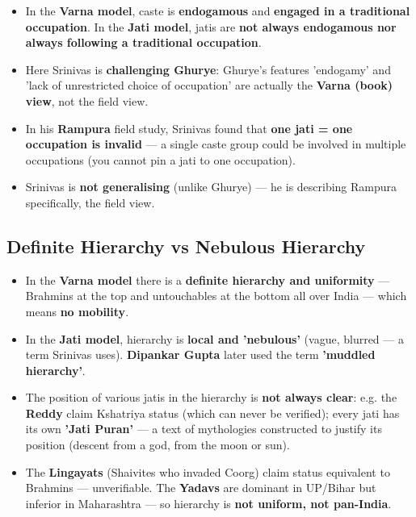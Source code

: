 \begin{KeyConcept}
\begin{itemize}
\item In the \textbf{Varna model}, caste is \textbf{endogamous} and \textbf{engaged in a traditional occupation}. In the \textbf{Jati model}, jatis are \textbf{not always endogamous nor always following a traditional occupation}.
\item Here Srinivas is \textbf{challenging Ghurye}: Ghurye's features 'endogamy' and 'lack of unrestricted choice of occupation' are actually the \textbf{Varna (book) view}, not the field view.
\item In his \textbf{Rampura} field study, Srinivas found that \textbf{one jati = one occupation is invalid} --- a single caste group could be involved in multiple occupations (you cannot pin a jati to one occupation).
\item Srinivas is \textbf{not generalising} (unlike Ghurye) --- he is describing Rampura specifically, the field view.
\end{itemize}
\end{KeyConcept}

\subsection{Definite Hierarchy vs Nebulous Hierarchy}

\begin{KeyConcept}
\begin{itemize}
\item In the \textbf{Varna model} there is a \textbf{definite hierarchy and uniformity} --- Brahmins at the top and untouchables at the bottom all over India --- which means \textbf{no mobility}.
\item In the \textbf{Jati model}, hierarchy is \textbf{local and 'nebulous'} (vague, blurred --- a term Srinivas uses). \textbf{Dipankar Gupta} later used the term \textbf{'muddled hierarchy'}.
\item The position of various jatis in the hierarchy is \textbf{not always clear}: e.g. the \textbf{Reddy} claim Kshatriya status (which can never be verified); every jati has its own \textbf{'Jati Puran'} --- a text of mythologies constructed to justify its position (descent from a god, from the moon or sun).
\item The \textbf{Lingayats} (Shaivites who invaded Coorg) claim status equivalent to Brahmins --- unverifiable. The \textbf{Yadavs} are dominant in UP/Bihar but inferior in Maharashtra --- so hierarchy is \textbf{not uniform, not pan-India}.
\end{itemize}
\end{KeyConcept}

